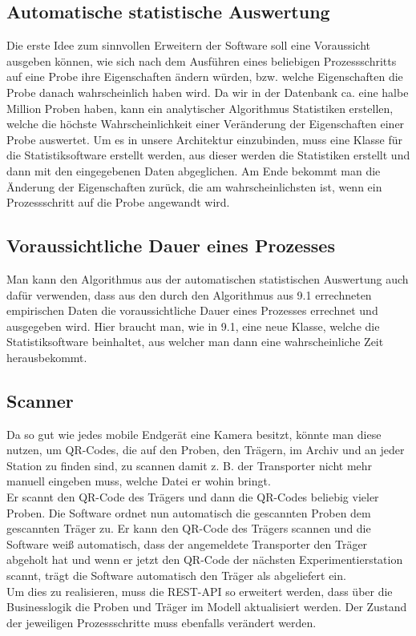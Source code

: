 \documentclass[enabledeprecatedfontcommands,fontsize=12pt,paper=a4,twoside]{scrartcl}
\begin{document}
\subsection{Automatische statistische Auswertung} 
{ Die erste Idee zum
  sinnvollen Erweitern der Software soll eine Voraussicht ausgeben können, wie
  sich nach dem Ausführen eines beliebigen Prozessschritts auf eine Probe ihre
  Eigenschaften ändern würden, bzw. welche Eigenschaften die Probe danach
  wahrscheinlich haben wird. Da wir in der Datenbank ca. eine halbe Million
  Proben haben, kann ein analytischer Algorithmus Statistiken erstellen, welche
  die höchste Wahrscheinlichkeit einer Veränderung der Eigenschaften einer Probe
  auswertet. Um es in unsere Architektur einzubinden, muss eine Klasse für die
  Statistiksoftware erstellt werden, aus dieser werden die Statistiken erstellt
  und dann mit den eingegebenen Daten abgeglichen. Am Ende bekommt man die
  Änderung der Eigenschaften zurück, die am wahrscheinlichsten ist, wenn ein Prozessschritt auf die Probe angewandt wird. 
}
\subsection{Voraussichtliche Dauer eines Prozesses} 
{ Man kann den Algorithmus aus der automatischen statistischen Auswertung auch dafür verwenden, dass aus den durch den Algorithmus aus 9.1 errechneten empirischen Daten die voraussichtliche Dauer eines Prozesses errechnet und ausgegeben wird. Hier braucht man, wie in 9.1, eine neue Klasse, welche die Statistiksoftware beinhaltet, aus welcher man dann eine wahrscheinliche Zeit herausbekommt.
}
\subsection{Scanner}{
  Da so gut wie jedes mobile Endgerät eine Kamera besitzt, könnte man diese nutzen, um QR-Codes, die auf den Proben, den Trägern, im Archiv und an jeder Station zu finden sind, zu scannen damit z. B. der Transporter nicht mehr manuell eingeben muss, welche Datei er wohin bringt. \\
  Er scannt den QR-Code des Trägers und dann die QR-Codes beliebig vieler
  Proben. Die Software ordnet nun automatisch die gescannten Proben dem
  gescannten Träger zu.
  Er kann den QR-Code des Trägers scannen und die Software weiß automatisch,
  dass der angemeldete Transporter den Träger abgeholt hat und wenn er jetzt den
  QR-Code der nächsten Experimentierstation scannt, trägt die Software
  automatisch den Träger als abgeliefert ein. \\

  Um dies zu realisieren, muss die REST-API so erweitert werden, dass über
  die Businesslogik die Proben und Träger im Modell aktualisiert werden. Der
  Zustand der jeweiligen Prozessschritte muss ebenfalls verändert werden.		
}
\end{document}
